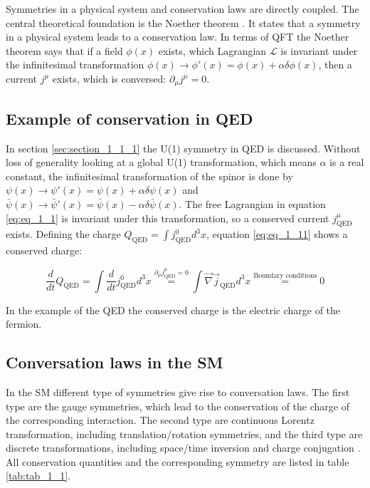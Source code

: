 Symmetries in a physical system and conservation laws are directly coupled. The central theoretical foundation is the Noether theorem \cite{NOTHERTHEOREM}. It states that a symmetry in a physical system leads to a conservation law. In terms of \gls{QFT} the Noether theorem says that if a field $\phi(x)$ exists, which Lagrangian $\mathcal{L}$ is invariant under the infinitesimal transformation $\phi(x) \rightarrow \phi'(x) = \phi(x) + \alpha \delta \phi(x)$, then a current $j^{\mu}$ exists, which is conversed: $\partial_{\mu}j^{\mu} = 0$.  

\subsection{Example of conservation in \gls{QED}}
\label{sec:section_1_2_1}

In section \ref{sec:section_1_1_1} the U(1) symmetry in \gls{QED} is discussed. Without loss of generality looking at a global U(1) transformation, which means $\alpha$ is a real constant, the infinitesimal transformation of the spinor is done by $\psi(x) \rightarrow \psi'(x) = \psi(x) + \alpha \delta \psi(x)$ and  $\bar{\psi}(x) \rightarrow \bar{\psi}'(x) = \bar{\psi}(x) - \alpha \delta \bar{\psi}(x)$. The free Lagrangian in equation \ref{eq:eq_1_1} is invariant under this transformation, so a conserved current $j_{\text{QED}}^{\mu}$ exists. Defining the charge $Q_{\text{QED}} = \int j^{0}_{\text{QED}} d^{3}x$, equation \ref{eq:eq_1_11} shows a conserved charge:

\begin{equation}
	\label{eq:eq_1_11}
	\frac{d}{dt} Q_{\text{QED}} = \int \frac{d}{dt}j^{0}_{\text{QED}}d^{3}x \overset{\partial_{\mu}j_{\text{QED}}^{\mu} = 0}{=} \int \vec{\nabla} \vec{j}_{\text{QED}}d^{3}x \overset{\text{Boundary conditions}}{=} 0
\end{equation}

In the example of the \gls{QED} the conserved charge is the electric charge of the fermion.

\subsection{Conversation laws in the \gls{SM}}
\label{sec:section_1_2_2}

In the \gls{SM} different type of symmetries give rise to conversation laws. The first type are the gauge symmetries, which lead to the conservation of the charge of the corresponding interaction. The second type are continuous Lorentz transformation, including translation/rotation symmetries, and the third type are discrete transformations, including space/time inversion and charge conjugation \cite{Peskin}. All conservation quantities and the corresponding symmetry are listed in table \ref{tab:tab_1_1}.

